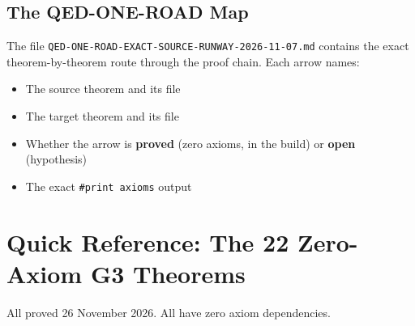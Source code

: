 \documentclass[11pt,a4paper]{article}
\newcommand{\lean}[1]{\texttt{#1}}
\newcommand{\file}[1]{\texttt{\small #1}}
\begin{document}
\subsection{The QED-ONE-ROAD Map}

The file \file{QED-ONE-ROAD-EXACT-SOURCE-RUNWAY-2026-11-07.md} contains the exact theorem-by-theorem route through the proof chain. Each arrow names:
\begin{itemize}
\item The source theorem and its file
\item The target theorem and its file
\item Whether the arrow is \textbf{proved} (zero axioms, in the build) or \textbf{open} (hypothesis)
\item The exact \lean{\#print axioms} output
\end{itemize}


\section{Quick Reference: The 22 Zero-Axiom G3 Theorems}

All proved 26 November 2026. All have zero axiom dependencies.
\end{document}
